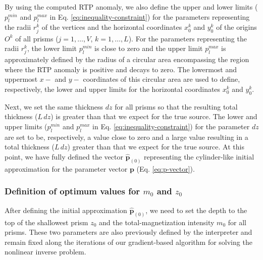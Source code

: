 By using the computed RTP anomaly, we also define the upper and lower limits 
($p_{l}^{min}$ and $p_{l}^{max}$ in Eq. \ref{eq:inequality-constraint}) for 
the parameters representing the radii $r^{k}_{j}$ of the vertices and the 
horizontal coordinates $x_{0}^{k}$ and $y_{0}^{k}$ of the origins $O^{k}$
of all prisms ($j=1,\dots , V$, $k=1,\dots ,L$). For the parameters representing
the radii $r^{k}_{j}$, the lower limit $p_{l}^{min}$ is close to zero and the 
upper limit $p_{l}^{max}$ is approximately defined by the radius of a circular area 
encompassing the region where the RTP anomaly is positive and decays to zero.
The lowermost and uppermost $x-$ and $y-$ coordinates of this circular area 
are used to define, respectively, the lower and upper limits for the 
horizontal coordinates $x_{0}^{k}$ and $y_{0}^{k}$. 

Next, we set the same thickness $dz$ for all prisms so that the resulting 
total thickness ($L \, dz$) is greater than that we expect for the true source.
The lower and upper limits ($p_{l}^{min}$ and $p_{l}^{max}$ in 
Eq. \ref{eq:inequality-constraint}) for the parameter $dz$ are set to be,
respectively, a value close to zero and a large value resulting in a 
total thickness ($L \, dz$) greater than that we expect for the true source.
At this point, we have fully defined the vector $\hat{\mathbf{p}}_{(0)}$ 
representing the cylinder-like initial approximation for the parameter 
vector $ \mathbf{p} $ (Eq. \ref{eq:p-vector}).

\subsubsection{Definition of optimum values for $m_{0}$ and $z_{0}$}

After defining the initial approximation $\hat{\mathbf{p}}_{(0)}$, we need
to set the depth to the top of the shallowest prism $z_0$ 
and the total-magnetization intensity $m_0$ for all prisms.
These two parameters are also previously defined by the interpreter and 
remain fixed along the iterations of our gradient-based algorithm for solving the 
nonlinear inverse problem. 

